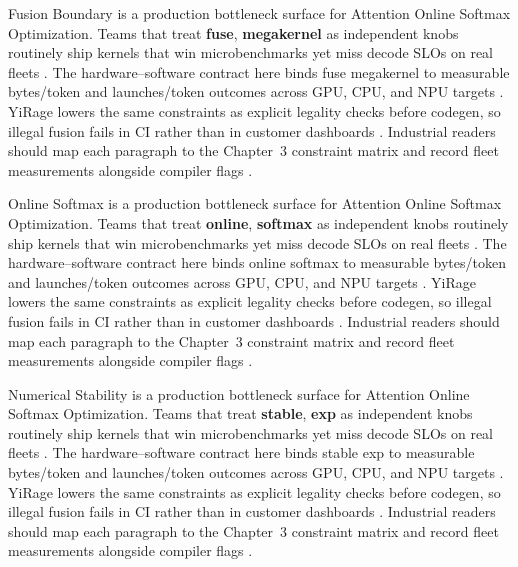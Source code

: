 Fusion Boundary is a production bottleneck surface for Attention Online Softmax Optimization. Teams that treat \textbf{fuse}, \textbf{megakernel} as independent knobs routinely ship kernels that win microbenchmarks yet miss decode SLOs on real fleets \citep{liu2024deepseekv3,memoryfloor2026}. The hardware--software contract here binds fuse megakernel to measurable bytes/token and launches/token outcomes across GPU, CPU, and NPU targets \citep{patel2025llminference,nvidia2022hopper}. YiRage lowers the same constraints as explicit legality checks before codegen, so illegal fusion fails in CI rather than in customer dashboards \citep{taxbreak2026,semianalysis2024tma}. Industrial readers should map each paragraph to the Chapter~3 constraint matrix and record fleet measurements alongside compiler flags \citep{memoryfloor2026,amd2024xdna}.

Online Softmax is a production bottleneck surface for Attention Online Softmax Optimization. Teams that treat \textbf{online}, \textbf{softmax} as independent knobs routinely ship kernels that win microbenchmarks yet miss decode SLOs on real fleets \citep{patel2025llminference,nvidia2022hopper}. The hardware--software contract here binds online softmax to measurable bytes/token and launches/token outcomes across GPU, CPU, and NPU targets \citep{taxbreak2026,semianalysis2024tma}. YiRage lowers the same constraints as explicit legality checks before codegen, so illegal fusion fails in CI rather than in customer dashboards \citep{memoryfloor2026,amd2024xdna}. Industrial readers should map each paragraph to the Chapter~3 constraint matrix and record fleet measurements alongside compiler flags \citep{nvidia2022hopper,amd2024aie}.

Numerical Stability is a production bottleneck surface for Attention Online Softmax Optimization. Teams that treat \textbf{stable}, \textbf{exp} as independent knobs routinely ship kernels that win microbenchmarks yet miss decode SLOs on real fleets \citep{taxbreak2026,semianalysis2024tma}. The hardware--software contract here binds stable exp to measurable bytes/token and launches/token outcomes across GPU, CPU, and NPU targets \citep{memoryfloor2026,amd2024xdna}. YiRage lowers the same constraints as explicit legality checks before codegen, so illegal fusion fails in CI rather than in customer dashboards \citep{nvidia2022hopper,amd2024aie}. Industrial readers should map each paragraph to the Chapter~3 constraint matrix and record fleet measurements alongside compiler flags \citep{semianalysis2024tma,dlbook}.

